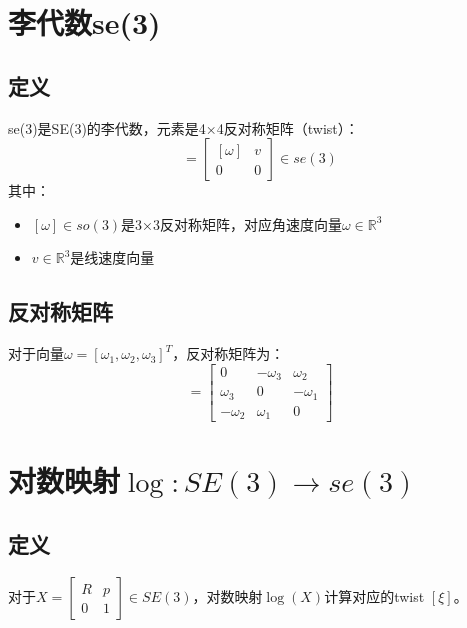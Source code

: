 \documentclass[12pt,a4paper]{article}
\begin{document}
\section{李代数se(3)}

\subsection{定义}

se(3)是SE(3)的李代数，元素是4×4反对称矩阵（twist）：
\begin{equation}
[\xi] = \begin{bmatrix}
[\omega] & v \\
0 & 0
\end{bmatrix} \in se(3)
\end{equation}
其中：
\begin{itemize}
\item $[\omega] \in so(3)$是3×3反对称矩阵，对应角速度向量$\omega \in \mathbb{R}^3$
\item $v \in \mathbb{R}^3$是线速度向量
\end{itemize}

\subsection{反对称矩阵}

对于向量$\omega = [\omega_1, \omega_2, \omega_3]^T$，反对称矩阵为：
\begin{equation}
[\omega] = \begin{bmatrix}
0 & -\omega_3 & \omega_2 \\
\omega_3 & 0 & -\omega_1 \\
-\omega_2 & \omega_1 & 0
\end{bmatrix}
\end{equation}

\section{对数映射$\log: SE(3) \to se(3)$}

\subsection{定义}

对于$X = \begin{bmatrix} R & p \\ 0 & 1 \end{bmatrix} \in SE(3)$，对数映射$\log(X)$计算对应的twist $[\xi]$。
\end{document}
